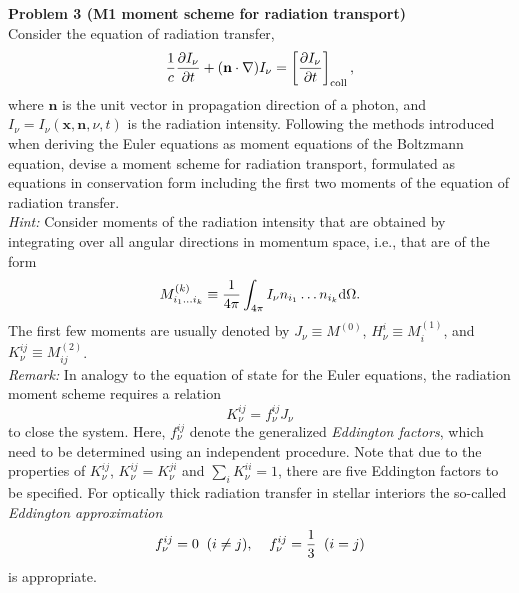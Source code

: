 \documentclass[letter,11pt]{article}
\begin{document}
\vspace{1cm}

{\noindent\large\textbf{Problem 3 (M1 moment scheme for radiation transport)}}\\

\noindent Consider the equation of radiation transfer,
\begin{equation}
	\frac{1}{c}\frac{\partial I_\nu}{\partial t} + (\mathbf{n\cdot\nabla}) I_\nu = \left[\frac{\partial I_\nu}{\partial t}\right]_{\rm coll},
\end{equation}
where $\mathbf{n}$ is the unit vector in propagation direction of a photon, and $I_\nu = I_\nu(\mathbf{x},\mathbf{n},\nu,t)$ is the radiation intensity. Following the methods introduced when deriving the Euler equations as moment equations of the Boltzmann equation, devise a moment scheme for radiation transport, formulated as equations in conservation form including the first two moments of the equation of radiation transfer. \\
\emph{Hint:} Consider moments of the radiation intensity that are obtained by integrating over all angular directions in momentum space, i.e., that are of the form
\begin{equation}
	M^{(k)}_{i_1\ldots i_k} \equiv \frac{1}{4\pi} \int_{4\pi} I_\nu n_{i_1}\ldots n_{i_k} {\rm d}\Omega.
\end{equation}
The first few moments are usually denoted by $J_\nu \equiv M^{(0)}$, $H_\nu^i\equiv M^{(1)}_{i}$, and $K^{ij}_\nu\equiv M^{(2)}_{ij}$.\\
\emph{Remark:} In analogy to the equation of state for the Euler equations, the radiation moment scheme requires a relation
\begin{equation}
	K^{ij}_\nu = f_\nu^{ij} J_\nu
\end{equation}
to close the system. Here, $f_\nu^{ij}$ denote the generalized \emph{Eddington factors}, which need to be determined using an independent procedure. Note that due to the properties of $K^{ij}_\nu$, $K^{ij}_\nu = K^{ji}_\nu$ and $\sum_i K^{ii}_\nu=1$, there are five Eddington factors to be specified. For optically thick radiation transfer in stellar interiors the so-called \emph{Eddington approximation}
\begin{equation}
	f^{ij}_\nu = 0 \;\;(i\ne j),\mskip20mu f_\nu^{ij} = \frac{1}{3} \;\; (i=j)
\end{equation}
is appropriate.
\end{document}

